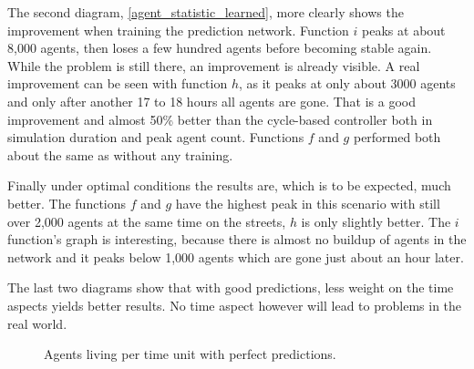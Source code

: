The second diagram, \autoref{agent_statistic_learned}, more clearly shows the improvement when training the prediction network. Function $i$ peaks at about 8,000 agents, then loses a few hundred agents before becoming stable again. While the problem is still there, an improvement is already visible. A real improvement can be seen with function $h$, as it peaks at only about 3000 agents and only after another 17 to 18 hours all agents are gone. That is a good improvement and almost 50\% better than the cycle-based controller both in simulation duration and peak agent count. Functions $f$ and $g$ performed both about the same as without any training.

Finally under optimal conditions the results are, which is to be expected, much better. The functions $f$ and $g$ have the highest peak in this scenario with still over 2,000 agents at the same time on the streets, $h$ is only slightly better. The $i$ function's graph is interesting, because there is almost no buildup of agents in the network and it peaks below 1,000 agents which are gone just about an hour later.

The last two diagrams show that with good predictions, less weight on the time aspects yields better results. No time aspect however will lead to problems in the real world. 

\begin{figure}[bt!]
	\centering
	\label{agent_statistic_perfect}
	\caption{Agents living per time unit with perfect predictions.}
\end{figure}
